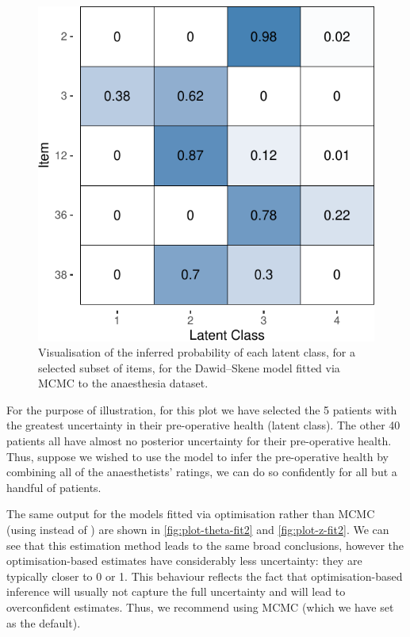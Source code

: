 \begin{figure}

{\centering \includegraphics{RJ-2023-064_files/figure-latex/plot-z-1} 

}

\caption{Visualisation of the inferred probability of each latent class, for a selected subset of items, for the Dawid--Skene model fitted via MCMC to the anaesthesia dataset.}\label{fig:plot-z}
\end{figure}

For the purpose of illustration, for this plot we have selected the 5 patients
with the greatest uncertainty in their pre-operative health (latent class). The
other 40 patients all have almost no posterior uncertainty for their
pre-operative health. Thus, suppose we wished to use the model to infer the
pre-operative health by combining all of the anaesthetists' ratings, we can do
so confidently for all but a handful of patients.

The same output for the models fitted via
optimisation rather than MCMC (using  instead of ) are
shown in \autoref{fig:plot-theta-fit2} and \autoref{fig:plot-z-fit2}. We can
see that this estimation method leads to the same broad conclusions, however the
optimisation-based estimates have considerably less uncertainty: they are
typically closer to 0 or 1. This behaviour reflects the fact that
optimisation-based inference will usually not capture the full uncertainty and
will lead to overconfident estimates. Thus, we recommend using MCMC (which we
have set as the default).

